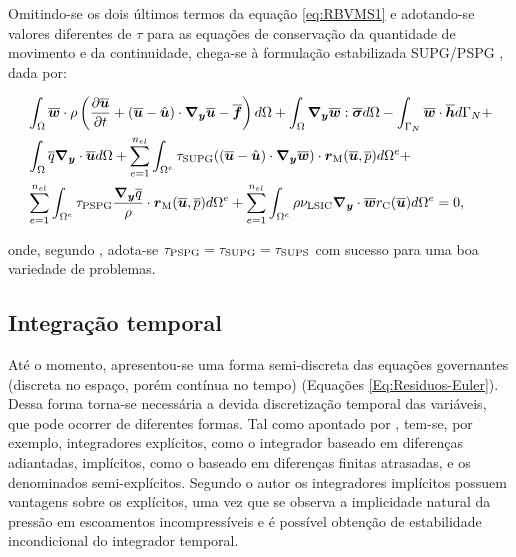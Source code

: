 Omitindo-se os dois últimos termos da equação \eqref{eq:RBVMS1} e adotando-se valores diferentes de $\tau$ para as equações de conservação da quantidade de movimento e da continuidade, chega-se à formulação estabilizada SUPG/PSPG \cite{tezduyar2000finite,tezduyar2003computation,catabriga2005compressible,catabriga2006compressible}, dada por:

\begin{equation}
    \begin{split}
        &\int_{\Omega}{\overline{\boldsymbol{w}}\cdot\rho\left({\frac{\partial{\overline{\boldsymbol{u}}}}{\partial t}+(\overline{\boldsymbol{u}}-\hat{\boldsymbol{u}})\cdot\boldsymbol{\nabla_y}\overline{\boldsymbol{u}}-\overline{\boldsymbol{f}}}\right) d\Omega}+\int_{\Omega}{\boldsymbol{\nabla_y}\overline{\boldsymbol{w}}:\overline{\boldsymbol{\sigma}} d\Omega}-\int_{\Gamma_N}{\overline{\boldsymbol{w}}\cdot\overline{\boldsymbol{h}} d\Gamma_N}+\\
        &\int_{\Omega}{\overline{q}\boldsymbol{\nabla_y}\cdot\overline{\boldsymbol{u}} d\Omega}+\sum_{e=1}^{n_{el}}{\int_{\Omega^e}{\tau_{\mathrm{SUPG}}((\overline{\boldsymbol{u}}-\hat{\boldsymbol{u}})\cdot\boldsymbol{\nabla_y}\overline{\boldsymbol{w}})\cdot\boldsymbol{r}_\mathrm{M}(\overline{\boldsymbol{u}},\overline{p}) d\Omega^e}}+\\
        &\sum_{e=1}^{n_{el}}{\int_{\Omega^e}{\tau_{\mathrm{PSPG}}\frac{\boldsymbol{\nabla_y}\overline{q}}{\rho}\cdot\boldsymbol{r}_\mathrm{M}(\overline{\boldsymbol{u}},\overline{p}) d\Omega^e}}+\sum_{e=1}^{n_{el}}{\int_{\Omega^e}{\rho\nu_{\mathrm{LSIC}}\boldsymbol{\nabla_y}\cdot\overline{\boldsymbol{w}}r_\mathrm{C}(\overline{\boldsymbol{u}}) d\Omega^e}}=0
        \text{,}
        \label{eq:SUPG-PSPG}
    \end{split}
\end{equation}

\noindent onde, segundo , adota-se $\tau_{\mathrm{PSPG}}=\tau_{\mathrm{SUPG}}=\tau_{\mathrm{SUPS}}$ com sucesso para uma boa variedade de problemas.

\subsection{Integração temporal} \label{IT-VMS}

Até o momento, apresentou-se uma forma semi-discreta das equações governantes (discreta no espaço, porém contínua no tempo) (Equações \eqref{Eq:Residuos-Euler}). Dessa forma torna-se necessária a devida discretização temporal das variáveis, que pode ocorrer de diferentes formas. Tal como apontado por , tem-se, por exemplo, integradores explícitos, como o integrador baseado em diferenças adiantadas, implícitos, como o baseado em diferenças finitas atrasadas, e os denominados semi-explícitos. Segundo o autor os integradores implícitos possuem vantagens sobre os explícitos, uma vez que se observa a implicidade natural da pressão em escoamentos incompressíveis e é possível obtenção de estabilidade incondicional do integrador temporal.

